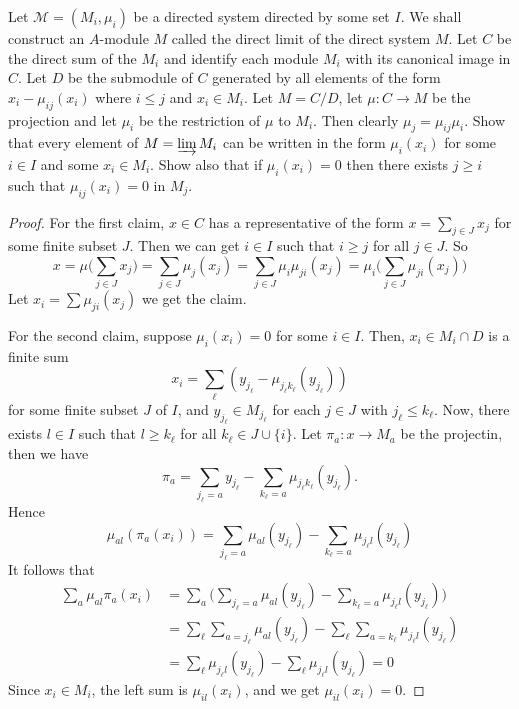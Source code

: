 \begin{exercise}\label{module directed limit}
Let $\mathcal{M}=(M_i,\mu_i)$ be a directed system directed by some set $I$. We shall construct an $A$-module $M$ called the direct limit of the direct system $M$. Let $C$ be the direct sum of the $M_i$ and identify each module $M_i$ with its canonical image in $C$. Let $D$ be the submodule of $C$ generated by all elements of the form $x_i-\mu_{ij}(x_i)$ where $i\leq j$ and $x_i\in M_i$. Let $M=C/D$, let $\mu:C\to M$ be the projection and let $\mu_i$ be the restriction of $\mu$ to $M_i$. Then clearly $\mu_j=\mu_{ij}\mu_i$. Show that every element of $M=\varinjlim M_i$ can be written in the form $\mu_i(x_i)$ for some $i\in I$ and some $x_i\in M_i$. Show also that if $\mu_i(x_i)=0$ then there exists $j\geq i$ such that $\mu_{ij}(x_i)=0$ in $M_j$.
\end{exercise}
\begin{proof}
For the first claim, $x\in C$ has a representative of the form $x=\sum_{j\in J}x_j$ for some finite subset $J$. Then we can get $i\in I$ such that $i\geq j$ for all $j\in J$. So
\[x=\mu\Big(\sum_{j\in J}x_j\Big)=\sum_{j\in J}\mu_j(x_j)=\sum_{j\in J}\mu_i\mu_{ji}(x_j)=\mu_i\Big(\sum_{j\in J}\mu_{ji}(x_j)\Big)\]
Let $x_i=\sum\mu_{ji}(x_j)$ we get the claim.\par
For the second claim, suppose $\mu_i(x_i)=0$ for some $i\in I$. Then, $x_i\in M_i\cap D$ is a finite sum
\[x_i=\sum_{\ell}(y_{j_\ell}-\mu_{j_{\ell}k_{\ell}}(y_{j_\ell}))\]
for some finite subset $J$ of $I$, and $y_{j_\ell}\in M_{j_\ell}$ for each $j\in J$ with $j_\ell\leq k_\ell$. Now, there exists $l\in I$ such that $l\geq k_\ell$ for all $k_\ell\in J\cup\{i\}$. Let $\pi_a:x\to M_a$ be the projectin, then we have
\[\pi_a=\sum_{j_\ell =a}y_{j_\ell}-\sum_{k_\ell=a}\mu_{j_\ell k_\ell}(y_{j_\ell}).\]
Hence
\[\mu_{al}(\pi_a(x_i))=\sum_{j_\ell =a}\mu_{al}(y_{j_\ell})-\sum_{k_\ell=a}\mu_{j_\ell l}(y_{j_\ell})\]
It follows that
\begin{align*}
\sum_a\mu_{al}\pi_a(x_i)&=\sum_a\Big(\sum_{j_\ell =a}\mu_{al}(y_{j_\ell})-\sum_{k_\ell=a}\mu_{j_\ell l}(y_{j_\ell})\Big)\\
&=\sum_{\ell}\sum_{a=j_\ell}\mu_{al}(y_{j_\ell})-\sum_{\ell}\sum_{a=k_\ell}\mu_{j_\ell l}(y_{j_\ell})\\
&=\sum_{\ell}\mu_{j_\ell l}(y_{j_\ell})-\sum_{\ell}\mu_{j_\ell l}(y_{j_\ell})=0
\end{align*}
Since $x_i\in M_i$, the left sum is $\mu_{il}(x_i)$, and we get $\mu_{il}(x_i)=0$.
\end{proof}
